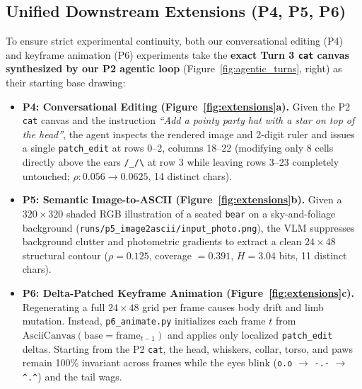 \documentclass[10pt,twocolumn]{article}
\begin{document}
\subsection{Unified Downstream Extensions (P4, P5, P6)}
To ensure strict experimental continuity, both our conversational editing (P4) and keyframe animation (P6) experiments take the \textbf{exact Turn 3 \texttt{cat} canvas synthesized by our P2 agentic loop} (Figure~\ref{fig:agentic_turns}, right) as their starting base drawing:
\begin{itemize}
  \item \textbf{P4: Conversational Editing (Figure~\ref{fig:extensions}a).} Given the P2 \texttt{cat} canvas and the instruction \emph{``Add a pointy party hat with a star on top of the head''}, the agent inspects the rendered image and 2-digit ruler and issues a single \texttt{patch\_edit} at rows 0--2, columns 18--22 (modifying only 8 cells directly above the ears \texttt{/\_/\textbackslash} at row 3 while leaving rows 3--23 completely untouched; $\rho: 0.056 \to 0.0625$, 14 distinct chars).
  \item \textbf{P5: Semantic Image-to-ASCII (Figure~\ref{fig:extensions}b).} Given a $320 \times 320$ shaded RGB illustration of a seated \texttt{bear} on a sky-and-foliage background (\texttt{runs/p5\_image2ascii/input\_photo.png}), the VLM suppresses background clutter and photometric gradients to extract a clean $24 \times 48$ structural contour ($\rho = 0.125$, coverage $= 0.391$, $H = 3.04$ bits, 11 distinct chars).
  \item \textbf{P6: Delta-Patched Keyframe Animation (Figure~\ref{fig:extensions}c).} Regenerating a full $24 \times 48$ grid per frame causes body drift and limb mutation. Instead, \texttt{p6\_animate.py} initializes each frame $t$ from $\text{AsciiCanvas}(\text{base}=\text{frame}_{t-1})$ and applies only localized \texttt{patch\_edit} deltas. Starting from the P2 \texttt{cat}, the head, whiskers, collar, torso, and paws remain 100\% invariant across frames while the eyes blink (\texttt{o.o} $\to$ \texttt{-.-} $\to$ \texttt{\textasciicircum.\textasciicircum}) and the tail wags.
\end{itemize}
\end{document}
